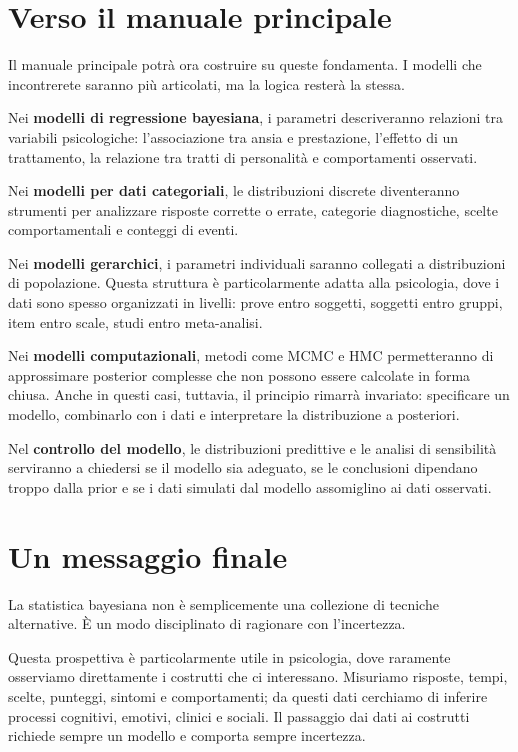 \documentclass[
  italian,
  letterpaper,
  a4paper,
  11pt,
  open=any]{scrbook}
\theoremstyle{plain}
\theoremstyle{definition}
\theoremstyle{definition}
\theoremstyle{remark}
\begin{document}
\section*{Verso il manuale
principale}\label{verso-il-manuale-principale}


Il manuale principale potrà ora costruire su queste fondamenta. I
modelli che incontrerete saranno più articolati, ma la logica resterà la
stessa.

Nei \textbf{modelli di regressione bayesiana}, i parametri descriveranno
relazioni tra variabili psicologiche: l'associazione tra ansia e
prestazione, l'effetto di un trattamento, la relazione tra tratti di
personalità e comportamenti osservati.

Nei \textbf{modelli per dati categoriali}, le distribuzioni discrete
diventeranno strumenti per analizzare risposte corrette o errate,
categorie diagnostiche, scelte comportamentali e conteggi di eventi.

Nei \textbf{modelli gerarchici}, i parametri individuali saranno
collegati a distribuzioni di popolazione. Questa struttura è
particolarmente adatta alla psicologia, dove i dati sono spesso
organizzati in livelli: prove entro soggetti, soggetti entro gruppi,
item entro scale, studi entro meta-analisi.

Nei \textbf{modelli computazionali}, metodi come MCMC e HMC
permetteranno di approssimare posterior complesse che non possono essere
calcolate in forma chiusa. Anche in questi casi, tuttavia, il principio
rimarrà invariato: specificare un modello, combinarlo con i dati e
interpretare la distribuzione a posteriori.

Nel \textbf{controllo del modello}, le distribuzioni predittive e le
analisi di sensibilità serviranno a chiedersi se il modello sia
adeguato, se le conclusioni dipendano troppo dalla prior e se i dati
simulati dal modello assomiglino ai dati osservati.

\section*{Un messaggio finale}\label{un-messaggio-finale}


La statistica bayesiana non è semplicemente una collezione di tecniche
alternative. È un modo disciplinato di ragionare con l'incertezza.

Questa prospettiva è particolarmente utile in psicologia, dove raramente
osserviamo direttamente i costrutti che ci interessano. Misuriamo
risposte, tempi, scelte, punteggi, sintomi e comportamenti; da questi
dati cerchiamo di inferire processi cognitivi, emotivi, clinici e
sociali. Il passaggio dai dati ai costrutti richiede sempre un modello e
comporta sempre incertezza.
\end{document}
